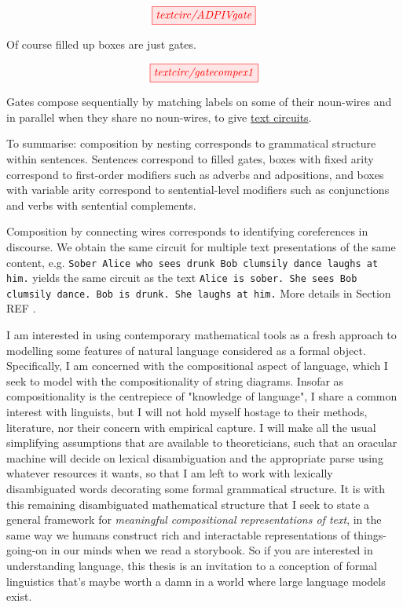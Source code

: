 \begin{marginfigure}
\centering
\[
\tikzfig{textcirc/ADPIVgate}
\]
\caption{Of course filled up boxes are just gates.}
\end{marginfigure}

\begin{marginfigure}
\centering
\[
\tikzfig{textcirc/gatecompex1}  
\]
\caption{Gates compose sequentially by matching labels on some of their noun-wires and in parallel when they share no noun-wires, to give \underline{text circuits}.}
\end{marginfigure}

\begin{marginfigure}
\centering
{}
\caption{To summarise: composition by nesting corresponds to grammatical structure within sentences. Sentences correspond to filled gates, boxes with fixed arity correspond to first-order modifiers such as adverbs and adpositions, and boxes with variable arity correspond to sentential-level modifiers such as conjunctions and verbs with sentential complements.}
\end{marginfigure}

\begin{marginfigure}
\centering
{}
\caption{Composition by connecting wires corresponds to identifying coreferences in discourse. We obtain the same circuit for multiple text presentations of the same content, e.g. \texttt{Sober Alice who sees drunk Bob clumsily dance laughs at him.} yields the same circuit as the text \texttt{Alice is sober. She sees Bob clumsily dance. Bob is drunk. She laughs at him.} More details in Section \bR REF \e.}
\end{marginfigure}


I am interested in using contemporary mathematical tools as a fresh approach to modelling some features of natural language considered as a formal object. Specifically, I am concerned with the compositional aspect of language, which I seek to model with the compositionality of string diagrams. Insofar as compositionality is the centrepiece of "knowledge of language", I share a common interest with linguists, but I will not hold myself hostage to their methods, literature, nor their concern with empirical capture. I will make all the usual simplifying assumptions that are available to theoreticians, such that an oracular machine will decide on lexical disambiguation and the appropriate parse using whatever resources it wants, so that I am left to work with lexically disambiguated words decorating some formal grammatical structure. It is with this remaining disambiguated mathematical structure that I seek to state a general framework for \emph{meaningful compositional representations of text}, in the same way we humans construct rich and interactable representations of things-going-on in our minds when we read a storybook. So if you are interested in understanding language, this thesis is an invitation to a conception of formal linguistics that's maybe worth a damn in a world where large language models exist.

